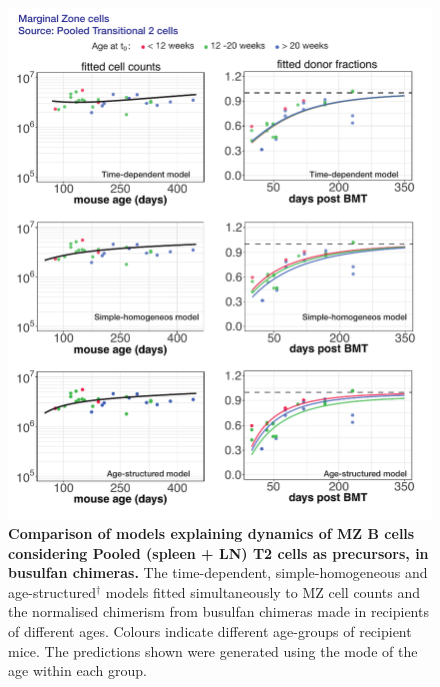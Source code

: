 \documentclass[11pt]{article}
\begin{document}
\begin{figure}[h!]
	\centerline{\includegraphics[scale = 1.1] {MZ_T2.pdf}}
	\caption{\small \textbf{Comparison of models  explaining dynamics of MZ B cells considering Pooled (spleen + LN) T2 cells as precursors, in busulfan chimeras.} The time-dependent, simple-homogeneous and age-structured$^{\dagger}$ models fitted simultaneously to MZ cell counts and the normalised chimerism from busulfan chimeras made in recipients of different ages. Colours indicate different age-groups of recipient mice. The predictions shown were generated using the  mode of the age within each group.}
	\label{fig:MZ_T2}
\end{figure}
\end{document}
